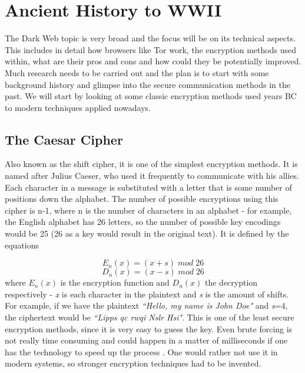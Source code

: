 \documentclass[a4paper, 12pt, titlepage]{article}
\begin{document}
\section{Ancient History to WWII}
The Dark Web topic is very broad and the focus will be on its technical aspects. This includes in detail how browsers like Tor work, the encryption methods used within, what are their pros and cons and how could they be potentially improved. Much research needs to be carried out and the plan is to start with some background history and glimpse into the secure communication methods in the past. We will start by looking at some classic encryption methods used years BC to modern techniques applied nowadays.

\subsection{The Caesar Cipher}
Also known as the shift cipher, it is one of the simplest encryption methods. It is named after Julius Caeser, who used it frequently to communicate with his allies. Each character in a message is substituted with a letter that is some number of positions down the alphabet. The number of possible encryptions using this cipher is n-1, where n is the number of characters in an alphabet - for example, the English alphabet has 26 letters, so the number of possible key encodings would be 25 (26 as a key would result in the original text). It is defined by the equations

\begin{equation*}
E_{n}(x) = (x + s) \;  mod \; 26
\end{equation*}
\begin{equation*}
D_{n}(x) = (x - s) \; mod \; 26
\end{equation*}
where $E_{n}(x)$ is the encryption function and $D_{n}(x)$ the decryption respectively - \textit{x} is each character in the plaintext and \textit{s} is the amount of shifts. For example, if we have the plaintext \textit{``Hello, my name is John Doe"} and \textit{s}=4, the ciphertext would be \textit{``Lipps qc rwqi Nslr Hsi"}. This is one of the least secure encryption methods, since it is very easy to guess the key. Even brute forcing is not really time consuming and could happen in a matter of milliseconds if one has the technology to speed up the process \cite{CaesarCipher}. One would rather not use it in modern systems, so stronger encryption techniques had to be invented.
\end{document}
